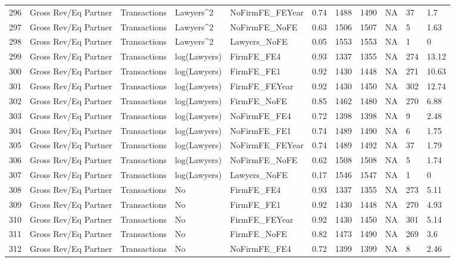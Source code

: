 \documentclass{article}
\begin{document}
\begin{table}[H]
\begin{tabular}{rllllllllll}
  296 & Gross Rev/Eq Partner & Transactions & Lawyers^2 & NoFirmFE\_FEYear & 0.74 & 1488 & 1490 & NA & 37 & 1.7 \\ 
  297 & Gross Rev/Eq Partner & Transactions & Lawyers^2 & NoFirmFE\_NoFE & 0.63 & 1506 & 1507 & NA & 5 & 1.63 \\ 
  298 & Gross Rev/Eq Partner & Transactions & Lawyers^2 & Lawyers\_NoFE & 0.05 & 1553 & 1553 & NA & 1 & 0 \\ 
  299 & Gross Rev/Eq Partner & Transactions & log(Lawyers) & FirmFE\_FE4 & 0.93 & 1337 & 1355 & NA & 274 & 13.12 \\ 
  300 & Gross Rev/Eq Partner & Transactions & log(Lawyers) & FirmFE\_FE1 & 0.92 & 1430 & 1448 & NA & 271 & 10.63 \\ 
  301 & Gross Rev/Eq Partner & Transactions & log(Lawyers) & FirmFE\_FEYear & 0.92 & 1430 & 1450 & NA & 302 & 12.74 \\ 
  302 & Gross Rev/Eq Partner & Transactions & log(Lawyers) & FirmFE\_NoFE & 0.85 & 1462 & 1480 & NA & 270 & 6.88 \\ 
  303 & Gross Rev/Eq Partner & Transactions & log(Lawyers) & NoFirmFE\_FE4 & 0.72 & 1398 & 1398 & NA & 9 & 2.48 \\ 
  304 & Gross Rev/Eq Partner & Transactions & log(Lawyers) & NoFirmFE\_FE1 & 0.74 & 1489 & 1490 & NA & 6 & 1.75 \\ 
  305 & Gross Rev/Eq Partner & Transactions & log(Lawyers) & NoFirmFE\_FEYear & 0.74 & 1489 & 1492 & NA & 37 & 1.79 \\ 
  306 & Gross Rev/Eq Partner & Transactions & log(Lawyers) & NoFirmFE\_NoFE & 0.62 & 1508 & 1508 & NA & 5 & 1.74 \\ 
  307 & Gross Rev/Eq Partner & Transactions & log(Lawyers) & Lawyers\_NoFE & 0.17 & 1546 & 1547 & NA & 1 & 0 \\ 
  308 & Gross Rev/Eq Partner & Transactions & No & FirmFE\_FE4 & 0.93 & 1337 & 1355 & NA & 273 & 5.11 \\ 
  309 & Gross Rev/Eq Partner & Transactions & No & FirmFE\_FE1 & 0.92 & 1430 & 1448 & NA & 270 & 4.93 \\ 
  310 & Gross Rev/Eq Partner & Transactions & No & FirmFE\_FEYear & 0.92 & 1430 & 1450 & NA & 301 & 5.14 \\ 
  311 & Gross Rev/Eq Partner & Transactions & No & FirmFE\_NoFE & 0.82 & 1473 & 1490 & NA & 269 & 3.6 \\ 
  312 & Gross Rev/Eq Partner & Transactions & No & NoFirmFE\_FE4 & 0.72 & 1399 & 1399 & NA & 8 & 2.46 \\ 

\end{tabular}
\end{table}
\end{document}
